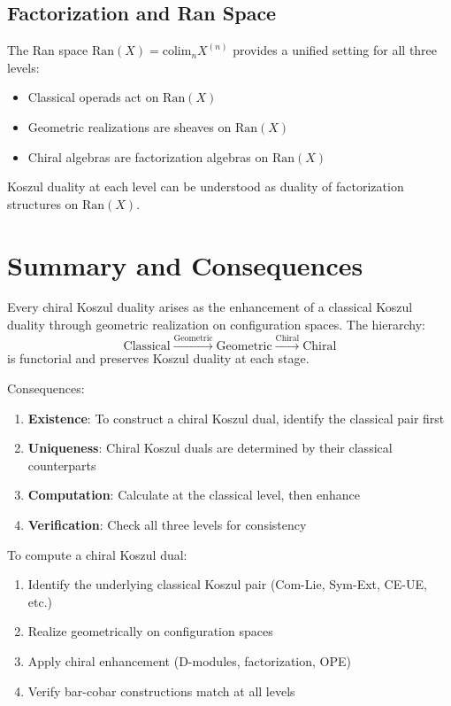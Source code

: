 \subsection{Factorization and Ran Space}

\begin{theorem}\label{thm:ran-perspective}
The Ran space $\text{Ran}(X) = \text{colim}_n X^{(n)}$ provides a unified setting for all three levels:

\begin{itemize}
\item Classical operads act on $\text{Ran}(X)$
\item Geometric realizations are sheaves on $\text{Ran}(X)$
\item Chiral algebras are factorization algebras on $\text{Ran}(X)$
\end{itemize}

Koszul duality at each level can be understood as duality of factorization structures on $\text{Ran}(X)$.
\end{theorem}

\section{Summary and Consequences}

\begin{theorem}\label{thm:three-level-main}
Every chiral Koszul duality arises as the enhancement of a classical Koszul duality through geometric realization on configuration spaces. The hierarchy:
$$\text{Classical} \xrightarrow{\text{Geometric}} \text{Geometric} \xrightarrow{\text{Chiral}} \text{Chiral}$$
is functorial and preserves Koszul duality at each stage.

Consequences:
\begin{enumerate}
\item \textbf{Existence}: To construct a chiral Koszul dual, identify the classical pair first
\item \textbf{Uniqueness}: Chiral Koszul duals are determined by their classical counterparts
\item \textbf{Computation}: Calculate at the classical level, then enhance
\item \textbf{Verification}: Check all three levels for consistency
\end{enumerate}
\end{theorem}

\begin{corollary}\label{cor:computational-strategy}
To compute a chiral Koszul dual:
\begin{enumerate}
\item Identify the underlying classical Koszul pair (Com-Lie, Sym-Ext, CE-UE, etc.)
\item Realize geometrically on configuration spaces
\item Apply chiral enhancement (D-modules, factorization, OPE)
\item Verify bar-cobar constructions match at all levels
\end{enumerate}
\end{corollary}


